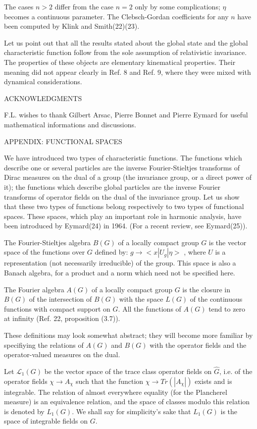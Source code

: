 \documentclass[a4paper,11pt]{article}
\begin{document}
The cases $n>2$ differ from the case $n=2$ only by some complications; $\eta$ becomes a 
continuous 
parameter. The Clebsch-Gordan coefficients for any $n$ have been computed by Klink and 
Smith(22)(23). 

Let us point out that all the results stated about the global state and the global 
characteristic function follow from the sole assumption of relativistic invariance. The 
properties of these objects are elementary kinematical properties. Their meaning did not appear 
clearly in Ref. 8 and Ref. 9, where they were mixed with dynamical considerations. 

ACKNOWLEDGMENTS

F.L. wishes to thank Gilbert Arsac, Pierre Bonnet and Pierre Eymard for useful mathematical informations and discussions. 

APPENDIX: FUNCTIONAL SPACES  

We have introduced two types of characteristic functions. The functions which describe one or 
several particles are the inverse Fourier-Stieltjes transforms of Dirac measures on the dual of 
a group (the invariance group, or a direct power of it); the functions which describe global 
particles are the inverse Fourier transforms of operator fields on the dual of the invariance 
group. Let us show that these two types of functions belong respectively to two types of 
functional spaces. These spaces, which play an important role in harmonic analysis, have been 
introduced by Eymard(24) in 1964. (For a recent review, see Eymard(25)). 

The Fourier-Stieltjes algebra $B(G)$ of a locally compact group $G$ is the vector space of the 
functions over $G$ defined by: $g \rightarrow <x|U_g|\eta>$ , where $U$ is a representation 
(not necessarily 
irreducible) of the group. This space is also a Banach algebra, for a product and a norm which 
need not be specified here. 

The Fourier algebra $A(G)$ of a locally compact group $G$ is the closure in $B(G)$ of the 
intersection of $B(G)$ with the space $L(G)$ of the continuous functions with compact support 
on $G$. All the functions of $A(G)$ tend to zero at infinity (Ref. 22, proposition (3.7)). 

These definitions may look somewhat abstract; they will become more familiar by specifiying the 
relations of $A(G)$ and $B(G)$ with the operator fields and the operator-valued measures on the 
dual.

Let $\mathcal{L}_1(G)$ be the vector space of the trace class operator fields on $\widehat{G}$, 
 i.e. 
of the operator fields  $\chi \rightarrow A_{\chi}$  such that the function             
$\chi \rightarrow Tr(|A_{\chi}|)$ exists and 
is integrable. The relation of almost everywhere equality (for the Plancherel measure) is an 
equivalence relation, and the space of classes modulo this relation is denoted by $L_1(G)$. We 
shall say for simplicity's sake that $L_1(G)$ is the space of integrable fields on $G$. 
\end{document}
